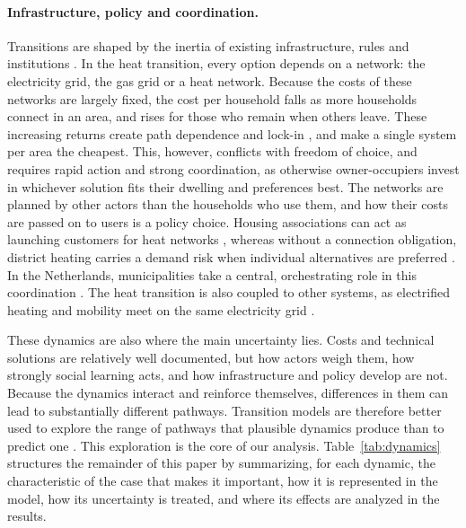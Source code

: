 \documentclass[preprint,12pt,authoryear]{elsarticle}
\begin{document}
\paragraph{Infrastructure, policy and coordination.}
Transitions are shaped by the inertia of existing infrastructure, rules and
institutions \citep{geelsTechnologicalTransitionsSystem2005,
verbongOngoingEnergyTransition2007}. In the heat transition, every option
depends on a network: the electricity grid, the gas grid or a heat network.
Because the costs of these networks are largely fixed, the cost per household
falls as more households connect in an area, and rises for those who remain
when others leave. These increasing returns create path dependence and
lock-in \citep{arthurCompetingTechnologiesIncreasing1989,
unruhUnderstandingCarbonLockin2000}, and make a single system per area the
cheapest. This, however, conflicts with freedom of choice, and requires rapid
action and strong coordination, as otherwise owner-occupiers invest in
whichever solution fits their dwelling and preferences best. The networks are
planned by other actors than the households who use them, and how their costs
are passed on to users is a policy choice. Housing associations can act as
launching customers for heat networks
\citep{vanderbentFutureSustainableHousing2022}, whereas without a connection
obligation, district heating carries a demand risk when individual
alternatives are preferred \citep{herrerasmartinezWhyGoPublic2023}. In the
Netherlands, municipalities take a central, orchestrating role in this
coordination \citep{herrerasmartinezMunicipalitiesKeyActors2022}. The heat
transition is also coupled to other systems, as electrified heating and
mobility meet on the same electricity grid
\citep{loomansExploringTradeoffsDecisionsupport2024,
rinaldiDecarbonisingHeatOptimal2021}.

These dynamics are also where the main uncertainty lies. Costs and technical
solutions are relatively well documented, but how actors weigh them, how
strongly social learning acts, and how infrastructure and policy develop are
not. Because the dynamics interact and reinforce themselves, differences in
them can lead to substantially different pathways. Transition models are
therefore better used to explore the range of pathways that plausible
dynamics produce than to predict one
\citep{holtzProspectsModellingSocietal2015,
moallemiModellingTransitionsVirtues2019,walkerDeepUncertainty2013}. This
exploration is the core of our analysis. Table~\ref{tab:dynamics} structures
the remainder of this paper by summarizing, for each dynamic, the
characteristic of the case that makes it important, how it is represented in
the model, how its uncertainty is treated, and where its effects are analyzed
in the results.
\end{document}
